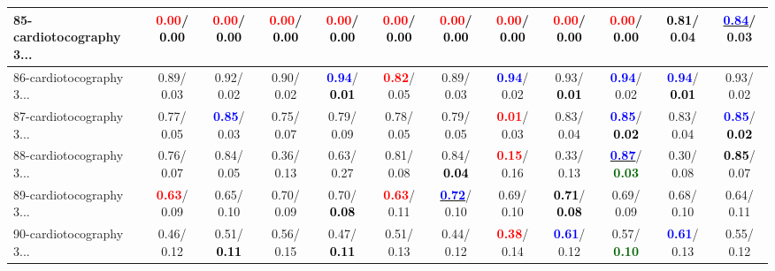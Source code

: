 \begin{table}[h]
\begin{center}
{\begin{tabular}{lc|c|c|c|c|c|c|c|c|c|c}
85-cardiotocography 3... & \textcolor{red}{\textbf{  0.00}}/\textcolor{black}{\textbf{  0.00}} & \textcolor{red}{\textbf{  0.00}}/\textcolor{black}{\textbf{  0.00}} & \textcolor{red}{\textbf{  0.00}}/\textcolor{black}{\textbf{  0.00}} & \textcolor{red}{\textbf{  0.00}}/\textcolor{black}{\textbf{  0.00}} & \textcolor{red}{\textbf{  0.00}}/\textcolor{black}{\textbf{  0.00}} & \textcolor{red}{\textbf{  0.00}}/\textcolor{black}{\textbf{  0.00}} & \textcolor{red}{\textbf{  0.00}}/\textcolor{black}{\textbf{  0.00}} & \textcolor{red}{\textbf{  0.00}}/\textcolor{black}{\textbf{  0.00}} & \textcolor{red}{\textbf{  0.00}}/\textcolor{black}{\textbf{  0.00}} & \textcolor{black}{\textbf{  0.81}}/  0.04 & \underline{\textcolor{blue}{\textbf{  0.84}}}/  0.03 \\ \hline
86-cardiotocography 3... &   0.89/  0.03 &   0.92/  0.02 &   0.90/  0.02 & \textcolor{blue}{\textbf{  0.94}}/\textcolor{black}{\textbf{  0.01}} & \textcolor{red}{\textbf{  0.82}}/  0.05 &   0.89/  0.03 & \textcolor{blue}{\textbf{  0.94}}/  0.02 &   0.93/\textcolor{black}{\textbf{  0.01}} & \textcolor{blue}{\textbf{  0.94}}/  0.02 & \textcolor{blue}{\textbf{  0.94}}/\textcolor{black}{\textbf{  0.01}} &   0.93/  0.02 \\
87-cardiotocography 3... &   0.77/  0.05 & \textcolor{blue}{\textbf{  0.85}}/  0.03 &   0.75/  0.07 &   0.79/  0.09 &   0.78/  0.05 &   0.79/  0.05 & \textcolor{red}{\textbf{  0.01}}/  0.03 &   0.83/  0.04 & \textcolor{blue}{\textbf{  0.85}}/\textcolor{black}{\textbf{  0.02}} &   0.83/  0.04 & \textcolor{blue}{\textbf{  0.85}}/\textcolor{black}{\textbf{  0.02}} \\
88-cardiotocography 3... &   0.76/  0.07 &   0.84/  0.05 &   0.36/  0.13 &   0.63/  0.27 &   0.81/  0.08 &   0.84/\textcolor{black}{\textbf{  0.04}} & \textcolor{red}{\textbf{  0.15}}/  0.16 &   0.33/  0.13 & \underline{\textcolor{blue}{\textbf{  0.87}}}/\textcolor{darkgreen}{\textbf{  0.03}} &   0.30/  0.08 & \textcolor{black}{\textbf{  0.85}}/  0.07 \\
89-cardiotocography 3... & \textcolor{red}{\textbf{  0.63}}/  0.09 &   0.65/  0.10 &   0.70/  0.09 &   0.70/\textcolor{black}{\textbf{  0.08}} & \textcolor{red}{\textbf{  0.63}}/  0.11 & \underline{\textcolor{blue}{\textbf{  0.72}}}/  0.10 &   0.69/  0.10 & \textcolor{black}{\textbf{  0.71}}/\textcolor{black}{\textbf{  0.08}} &   0.69/  0.09 &   0.68/  0.10 &   0.64/  0.11 \\
90-cardiotocography 3... &   0.46/  0.12 &   0.51/\textcolor{black}{\textbf{  0.11}} &   0.56/  0.15 &   0.47/\textcolor{black}{\textbf{  0.11}} &   0.51/  0.13 &   0.44/  0.12 & \textcolor{red}{\textbf{  0.38}}/  0.14 & \textcolor{blue}{\textbf{  0.61}}/  0.12 &   0.57/\textcolor{darkgreen}{\textbf{  0.10}} & \textcolor{blue}{\textbf{  0.61}}/  0.13 &   0.55/  0.12 \\

\end{tabular}}
\end{center}
\end{table}
